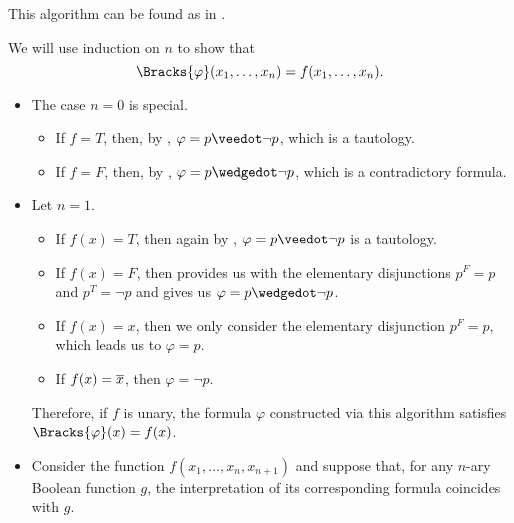 \begin{comments}
  \item This algorithm can be found as  in \cite{notebook:code}.
\end{comments}
\begin{defproof}
  We will use induction on \( n \) to show that
  \begin{equation*}
    \Bracks{\varphi}(x_1, \ldots, x_n) = f(x_1, \ldots, x_n).
  \end{equation*}

  \begin{itemize}
    \item The case \( n = 0 \) is special.
    \begin{itemize}
      \item If \( f = T \), then, by , \( \varphi = p \synvee \neg p \), which is a tautology.
      \item If \( f = F \), then, by , \( \varphi = p \synwedge \neg p \), which is a contradictory formula.
    \end{itemize}

    \item Let \( n = 1 \).
    \begin{itemize}
      \item If \( f(x) = T \), then again by , \( \varphi = p \synvee \neg p \) is a tautology.
      \item If \( f(x) = F \), then  provides us with the elementary disjunctions \( p^F = p \) and \( p^T = \neg p \) and  gives us \( \varphi = p \synwedge \neg p \).
      \item If \( f(x) = x \), then we only consider the elementary disjunction \( p^F = p \), which leads us to \( \varphi = p \).
      \item If \( f(x) = \oline{x} \), then \( \varphi = \neg p \).
    \end{itemize}

    Therefore, if \( f \) is unary, the formula \( \varphi \) constructed via this algorithm satisfies \( \Bracks{\varphi}(x) = f(x) \).

    \item Consider the function \( f(x_1, \ldots, x_n, x_{n+1}) \) and suppose that, for any \( n \)-ary Boolean function \( g \), the interpretation of its corresponding formula coincides with \( g \).


\end{itemize}
\end{defproof}
